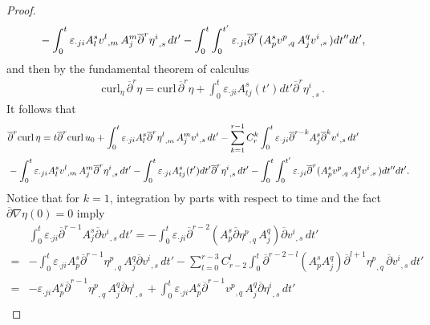 \documentclass[12pt,twoside,reqno]{amsart}
\numberwithin{equation}{section}
\theoremstyle{definition}
\theoremstyle{remark}
\begin{document}
\begin{proof}
\begin{align*}
  &-\int_0^t{\varepsilon}_{\cdot ji}A_l^s{{{v^l}}_{,{m}}\,}A^m_j{\overline{\partial}}^r  {{{\eta^i}}_{,{s}}\,}dt'-\int_0^t \int_0^{t'}{\varepsilon}_{\cdot ji} {\overline{\partial}}^r  (A_p^s {{{v^p}}_{,{q}}\,} A^q_j{{{v^i}}_{,{s}}\,})dt''dt',{\nonumber}
\end{align*}
and then by the fundamental theorem of calculus
\begin{align}\label{eq.curleta41}
  &{\mathrm{curl}_\eta\,} {\overline{\partial}}^r \eta
  ={\mathrm{curl}\,} {\overline{\partial}}^r \eta+\int_0^t {\varepsilon}_{\cdot ji}A^s_{tj}(t')dt'{\overline{\partial}}^r  {{{\eta^i}}_{,{s}}\,}.
\end{align}
It follows that
\begin{align*}
  &{\overline{\partial}}^r{\mathrm{curl}\,} \eta
  =t{\overline{\partial}}^r{\mathrm{curl}\,}  u_0+\int_0^t{\varepsilon}_{\cdot ji} A_l^s{\overline{\partial}}^r  {{{\eta^l}}_{,{m}}\,}A^m_j {{{v^i}}_{,{s}}\,}dt'-\sum_{k=1}^{r-1}C_r^k\int_0^t {\varepsilon}_{\cdot ji}{\overline{\partial}}^{r-k}A^s_j{\overline{\partial}}^k {{{v^i}}_{,{s}}\,}dt'\\
  &-\int_0^t{\varepsilon}_{\cdot ji}A_l^s{{{v^l}}_{,{m}}\,}A^m_j{\overline{\partial}}^r  {{{\eta^i}}_{,{s}}\,}dt'-\int_0^t {\varepsilon}_{\cdot ji}A^s_{tj}(t')dt'{\overline{\partial}}^r {{{\eta^i}}_{,{s}}\,}dt'-\int_0^t \int_0^{t'}{\varepsilon}_{\cdot ji} {\overline{\partial}}^r  (A_p^s {{{v^p}}_{,{q}}\,} A^q_j{{{v^i}}_{,{s}}\,})dt''dt'.{\nonumber}
\end{align*}
Notice that for $k=1$, integration by parts with respect to time and the fact ${\overline{\partial}}{\nabla}\eta(0)=0$ imply
\begin{align*}
&\int_0^t {\varepsilon}_{\cdot ji}{\overline{\partial}}^{{r-1}}A^s_j{\overline{\partial}} {{{v^i}}_{,{s}}\,}dt'=-\int_0^t {\varepsilon}_{\cdot ji}{\overline{\partial}}^{r-2}(A^s_p{\overline{\partial}}{{{\eta^p}}_{,{q}}\,}A^q_j){\overline{\partial}} {{{v^i}}_{,{s}}\,}dt'\\
  =&-\int_0^t {\varepsilon}_{\cdot ji}A^s_p{\overline{\partial}}^{r-1}{{{\eta^p}}_{,{q}}\,}A^q_j{\overline{\partial}} {{{v^i}}_{,{s}}\,}dt'-\sum_{l=0}^{r-3}C_{r-2}^l\int_0^t{\overline{\partial}}^{r-2-l}(A^s_p A^q_j){\overline{\partial}}^{l+1}{{{\eta^p}}_{,{q}}\,}{\overline{\partial}} {{{v^i}}_{,{s}}\,}dt'\\
  =&-{\varepsilon}_{\cdot ji}A^s_p{\overline{\partial}}^{r-1}{{{\eta^p}}_{,{q}}\,}A^q_j{\overline{\partial}} {{{\eta^i}}_{,{s}}\,}+\int_0^t {\varepsilon}_{\cdot ji}A^s_p{\overline{\partial}}^{r-1}{{{v^p}}_{,{q}}\,}A^q_j{\overline{\partial}} {{{\eta^i}}_{,{s}}\,}dt'\\

\end{align*}
\end{proof}
\end{document}
